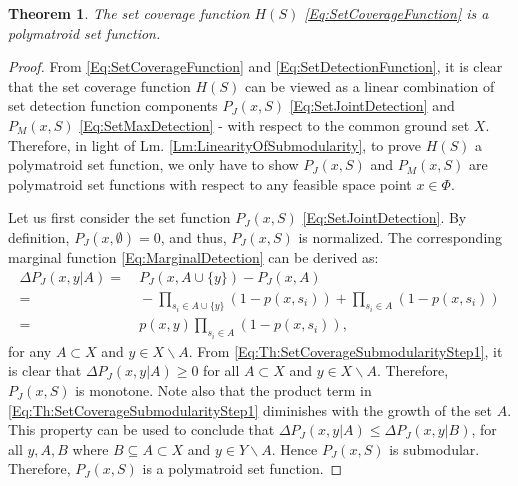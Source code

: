 \documentclass[letterpaper, 10 pt, conference]{ieeeconf}
\newtheorem{theorem}{Theorem}
\begin{document}
\begin{theorem}\label{Th:SetCoverageSubmodularity}
The set coverage function $H(S)$ \eqref{Eq:SetCoverageFunction} is a polymatroid set function.
\end{theorem}
\begin{proof}
From \eqref{Eq:SetCoverageFunction} and \eqref{Eq:SetDetectionFunction}, it is clear that the set coverage function $H(S)$ can be viewed as a linear combination of set detection function components $P_J(x,S)$ \eqref{Eq:SetJointDetection} and $P_M(x,S)$ \eqref{Eq:SetMaxDetection} - with respect to the common ground set $X$. Therefore, in light of Lm. \ref{Lm:LinearityOfSubmodularity}, to prove $H(S)$ a polymatroid set function, we only have to show $P_J(x,S)$ and $P_M(x,S)$ are polymatroid set functions with respect to any feasible space point $x\in\Phi$. 

Let us first consider the set function $P_J(x,S)$ \eqref{Eq:SetJointDetection}. By definition, $P_J(x,\emptyset) = 0$, and thus, $P_J(x,S)$ is normalized. The corresponding marginal function \eqref{Eq:MarginalDetection} can be derived as:
\begin{align}
\Delta P_J(x,y \vert A) =&\ P_J(x,A\cup\{y\}) - P_J(x,A) \nonumber\\    
=&\ -\prod_{s_i\in A\cup\{y\}}(1-p(x,s_i)) +\prod_{s_i\in A}(1-p(x,s_i)) \nonumber\\
=&\ p(x,y)\prod_{s_i\in A}(1-p(x,s_i)), \label{Eq:Th:SetCoverageSubmodularityStep1}
\end{align}
for any $A \subset X$ and $y\in X\backslash A$. 
From \eqref{Eq:Th:SetCoverageSubmodularityStep1}, it is clear that $\Delta P_J(x,y \vert A) \geq 0$ for all $A \subset X$ and $y\in X\backslash A$. Therefore, $P_J(x,S)$ is monotone. Note also that the product term in \eqref{Eq:Th:SetCoverageSubmodularityStep1} diminishes with the growth of the set $A$. This property can be used to conclude that $\Delta P_J(x,y \vert A) \leq \Delta P_J(x,y \vert B)$, for all $y,A,B$ where $B\subseteq A \subset X$ and $y\in Y\backslash A$. Hence $P_J(x,S)$ is submodular. Therefore, $P_J(x,S)$ is a polymatroid set function.


\end{proof}
\end{document}
